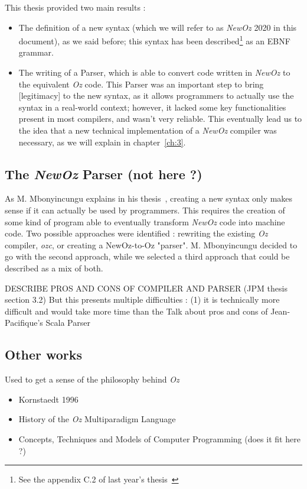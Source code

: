 This thesis provided two main results :
\begin{itemize}
    \item The definition of a new syntax (which we will refer to as \textit{NewOz} 2020 in this document), as we said before;
    this syntax has been described\footnote{See the appendix C.2 of last year's thesis~\cite{jpthesis}} as an EBNF grammar.
    \item The writing of a Parser, which is able to convert code written in \textit{NewOz} to the equivalent \textit{Oz} code.
    This Parser was an important step to bring [legitimacy] to the new syntax, as it allows programmers to actually use the syntax in a real-world context;
    however, it lacked some key functionalities present in most compilers, and wasn't very reliable.
    This eventually lead us to the idea that a new technical implementation of a \textit{NewOz} compiler was necessary, as we will explain in chapter~\ref{ch:3}.
\end{itemize}

\subsection{The \textit{NewOz} Parser (not here ?)}\label{subsec:ch1-parser}
As M. Mbonyincungu explains in his thesis~\cite{jpthesis}, creating a new syntax only makes sense if it can actually be used by programmers.
This requires the creation of some kind of program able to eventually transform \textit{NewOz} code into machine code.
Two possible approaches were identified : rewriting the existing \textit{Oz} compiler, \textit{ozc}, or creating a NewOz-to-Oz "parser".
M. Mbonyincungu decided to go with the second approach, while we selected a third approach that could be described as a mix of both.

DESCRIBE PROS AND CONS OF COMPILER AND PARSER (JPM thesis section 3.2)
But this presents multiple difficulties : (1) it is technically more difficult and would take more time than the
Talk about pros and cons of Jean-Pacifique's Scala Parser

\subsection{Other works}\label{subsec:ch1-others}
Used to get a sense of the philosophy behind \textit{Oz}
\begin{itemize}
    \item Kornstaedt 1996
    \item History of the \textit{Oz} Multiparadigm Language
    \item Concepts, Techniques and Models of Computer Programming (does it fit here ?)
\end{itemize}

